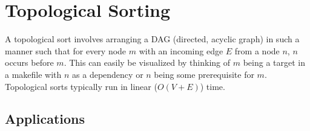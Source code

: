 \section{Topological Sorting}
A topological sort involves arranging a DAG (directed, acyclic graph) in such a manner such that for every node $m$ with an incoming edge $E$ from a node $n$, $n$ occurs before $m$.
This can easily be visualized by thinking of $m$ being a target in a makefile with $n$ as a dependency or $n$ being some prerequisite for $m$.
Topological sorts typically run in linear ($O(V + E)$) time.

\subsection{Applications}

